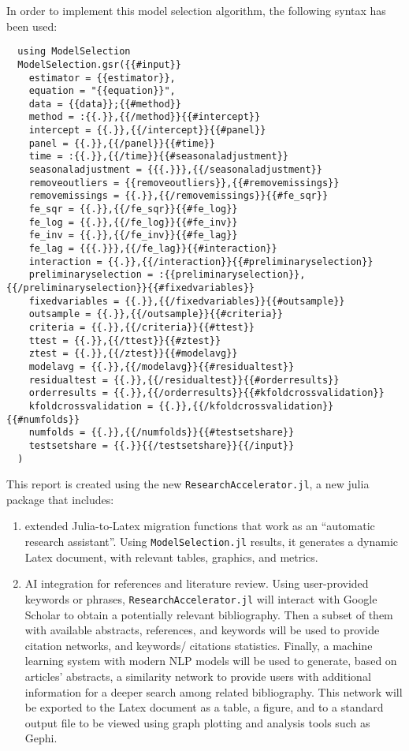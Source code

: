 \documentclass{article}
\begin{document}
In order to implement this model selection algorithm, the following syntax has been used:

\begin{lstlisting} 
  using ModelSelection
  ModelSelection.gsr({{#input}}
    estimator = {{estimator}},
    equation = "{{equation}}",
    data = {{data}};{{#method}}
    method = :{{.}},{{/method}}{{#intercept}}
    intercept = {{.}},{{/intercept}}{{#panel}}
    panel = {{.}},{{/panel}}{{#time}}
    time = :{{.}},{{/time}}{{#seasonaladjustment}}
    seasonaladjustment = {{{.}}},{{/seasonaladjustment}}
    removeoutliers = {{removeoutliers}},{{#removemissings}}
    removemissings = {{.}},{{/removemissings}}{{#fe_sqr}}
    fe_sqr = {{.}},{{/fe_sqr}}{{#fe_log}}
    fe_log = {{.}},{{/fe_log}}{{#fe_inv}}
    fe_inv = {{.}},{{/fe_inv}}{{#fe_lag}}
    fe_lag = {{{.}}},{{/fe_lag}}{{#interaction}}
    interaction = {{.}},{{/interaction}}{{#preliminaryselection}}
    preliminaryselection = :{{preliminaryselection}},{{/preliminaryselection}}{{#fixedvariables}}
    fixedvariables = {{.}},{{/fixedvariables}}{{#outsample}}
    outsample = {{.}},{{/outsample}}{{#criteria}}
    criteria = {{.}},{{/criteria}}{{#ttest}}
    ttest = {{.}},{{/ttest}}{{#ztest}}
    ztest = {{.}},{{/ztest}}{{#modelavg}}
    modelavg = {{.}},{{/modelavg}}{{#residualtest}}
    residualtest = {{.}},{{/residualtest}}{{#orderresults}}
    orderresults = {{.}},{{/orderresults}}{{#kfoldcrossvalidation}}
    kfoldcrossvalidation = {{.}},{{/kfoldcrossvalidation}}{{#numfolds}}
    numfolds = {{.}},{{/numfolds}}{{#testsetshare}}
    testsetshare = {{.}}{{/testsetshare}}{{/input}}
  )
\end{lstlisting}

This report is created using the new \verb|ResearchAccelerator.jl|, a new julia package that includes:
\begin{enumerate}
  \item extended Julia-to-Latex migration functions that work as an “automatic research assistant”. Using \verb|ModelSelection.jl| results, it generates a dynamic Latex document, with relevant tables, graphics, and metrics.
  
  \item AI integration for references and literature review. Using user-provided keywords or phrases, \verb|ResearchAccelerator.jl| will interact with Google Scholar to obtain a potentially relevant bibliography. Then a subset of them with available abstracts, references, and keywords will be used to provide citation networks, and keywords/ citations statistics. Finally, a machine learning system with modern NLP models will be used to generate, based on articles’ abstracts, a similarity network to provide users with additional information for a deeper search among related bibliography. This network will be exported to the Latex document as a table, a figure, and to a standard output file to be viewed using graph plotting and analysis tools such as Gephi.
\end{enumerate}
\end{document}
